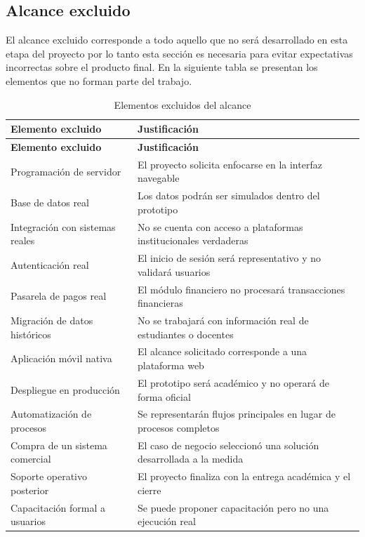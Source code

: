 \documentclass[11pt,spanish]{article}
\begin{document}
\subsection{Alcance excluido}

El alcance excluido corresponde a todo aquello que no será desarrollado en esta etapa del proyecto por lo tanto esta sección es necesaria para evitar expectativas incorrectas sobre el producto final. En la siguiente tabla se presentan los elementos que no forman parte del trabajo.

\begin{longtable}{L{5.2cm} L{9.2cm}}
\caption{Elementos excluidos del alcance}\label{tab:alcance-excluido}\\[-0.5em]
\toprule
\textbf{Elemento excluido} & \textbf{Justificación} \\
\midrule
\endfirsthead
\toprule
\textbf{Elemento excluido} & \textbf{Justificación} \\
\midrule
\endhead
Programación de servidor & El proyecto solicita enfocarse en la interfaz navegable \\
Base de datos real & Los datos podrán ser simulados dentro del prototipo \\
Integración con sistemas reales & No se cuenta con acceso a plataformas institucionales verdaderas \\
Autenticación real & El inicio de sesión será representativo y no validará usuarios \\
Pasarela de pagos real & El módulo financiero no procesará transacciones financieras \\
Migración de datos históricos & No se trabajará con información real de estudiantes o docentes \\
Aplicación móvil nativa & El alcance solicitado corresponde a una plataforma web \\
Despliegue en producción & El prototipo será académico y no operará de forma oficial \\
Automatización de procesos & Se representarán flujos principales en lugar de procesos completos \\
Compra de un sistema comercial & El caso de negocio seleccionó una solución desarrollada a la medida \\
Soporte operativo posterior & El proyecto finaliza con la entrega académica y el cierre \\
Capacitación formal a usuarios & Se puede proponer capacitación pero no una ejecución real \\
\bottomrule
\end{longtable}
\end{document}
